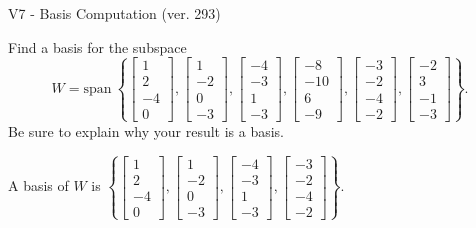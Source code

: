 \begin{exercise}
  \begin{exerciseTitle}V7 - Basis Computation (ver. 293)\end{exerciseTitle}
  \begin{exerciseStatement}
    Find a basis for the subspace 
\[W=\mathrm{span}\ \left\{\left[\begin{array}{r}
1 \\
2 \\
-4 \\
0
\end{array}\right] , \left[\begin{array}{r}
1 \\
-2 \\
0 \\
-3
\end{array}\right] , \left[\begin{array}{r}
-4 \\
-3 \\
1 \\
-3
\end{array}\right] , \left[\begin{array}{r}
-8 \\
-10 \\
6 \\
-9
\end{array}\right] , \left[\begin{array}{r}
-3 \\
-2 \\
-4 \\
-2
\end{array}\right] , \left[\begin{array}{r}
-2 \\
3 \\
-1 \\
-3
\end{array}\right]\right\}.\]
 Be sure to explain why your result is a basis.


  \end{exerciseStatement}
  \begin{exerciseAnswer}
   A basis of \(W\) is  \(\left\{\left[\begin{array}{r}
1 \\
2 \\
-4 \\
0
\end{array}\right] , \left[\begin{array}{r}
1 \\
-2 \\
0 \\
-3
\end{array}\right] , \left[\begin{array}{r}
-4 \\
-3 \\
1 \\
-3
\end{array}\right] , \left[\begin{array}{r}
-3 \\
-2 \\
-4 \\
-2
\end{array}\right]\right\}\).
  


  \end{exerciseAnswer}
\end{exercise}
